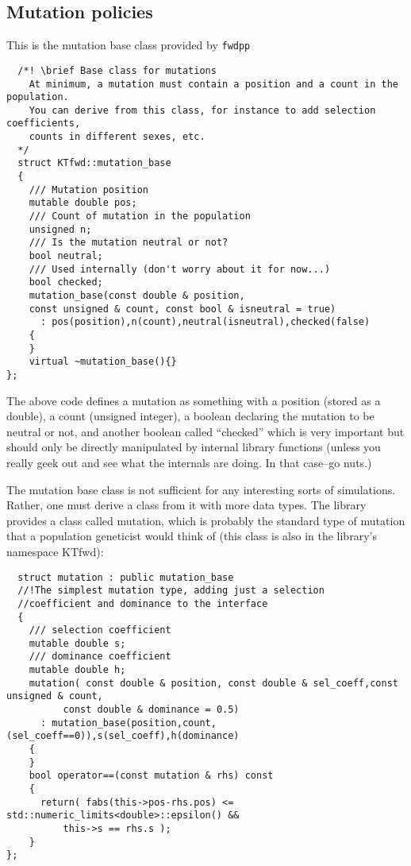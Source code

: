 \documentclass{article}
\begin{document}
\subsection{Mutation policies}
This is the mutation base class  provided by \texttt{fwdpp}
\begin{lstlisting}
  /*! \brief Base class for mutations
    At minimum, a mutation must contain a position and a count in the population.	
    You can derive from this class, for instance to add selection coefficients,
    counts in different sexes, etc.
  */
  struct KTfwd::mutation_base
  {
    /// Mutation position
    mutable double pos;
    /// Count of mutation in the population
    unsigned n;
    /// Is the mutation neutral or not?
    bool neutral;
    /// Used internally (don't worry about it for now...)
    bool checked;
    mutation_base(const double & position, 
    const unsigned & count, const bool & isneutral = true)
      : pos(position),n(count),neutral(isneutral),checked(false)
    {	
    }
    virtual ~mutation_base(){}
};
\end{lstlisting}

The above code defines a mutation as something with a position (stored as a double), a count (unsigned integer), a boolean declaring the mutation to be neutral or not, and another boolean called ``checked'' which is very important but should only be directly manipulated by internal library functions (unless you really geek out and see what the internals are doing.  In that case--go nuts.)

The mutation base class is not sufficient for any interesting sorts of simulations.  Rather, one must derive a class from it with more data types.  The library provides a class called mutation, which is probably the standard type of mutation that a population geneticist would think of (this class is also in the library's namespace KTfwd):

\begin{lstlisting}
  struct mutation : public mutation_base
  //!The simplest mutation type, adding just a selection 
  //coefficient and dominance to the interface
  {
    /// selection coefficient
    mutable double s;
    /// dominance coefficient
    mutable double h;
    mutation( const double & position, const double & sel_coeff,const unsigned & count,
	      const double & dominance = 0.5) 
      : mutation_base(position,count,(sel_coeff==0)),s(sel_coeff),h(dominance)
    {
    }
    bool operator==(const mutation & rhs) const
    {
      return( fabs(this->pos-rhs.pos) <= std::numeric_limits<double>::epsilon() &&
	      this->s == rhs.s );
    }
};
\end{lstlisting}
\end{document}
